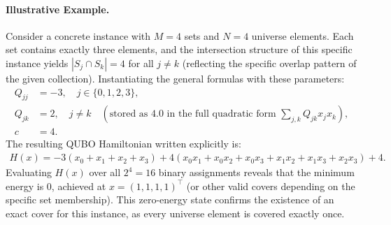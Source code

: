 \documentclass[12pt]{article}
\begin{document}
\paragraph{Illustrative Example.}
Consider a concrete instance with $M = 4$ sets and $N = 4$ universe elements. Each set contains exactly three elements, and the intersection structure of this specific instance yields $|S_j \cap S_k| = 4$ for all $j \neq k$ (reflecting the specific overlap pattern of the given collection). Instantiating the general formulas with these parameters:
\begin{align}
    Q_{jj} &= -3, \quad j \in \{0, 1, 2, 3\}, \\
    Q_{jk} &= 2, \quad j \neq k \quad (\text{stored as } 4.0 \text{ in the full quadratic form } \sum_{j,k} Q_{jk}x_jx_k), \\
    c &= 4.
\end{align}
The resulting QUBO Hamiltonian written explicitly is:
\begin{align}
    H(x) = -3(x_0 + x_1 + x_2 + x_3) + 4(x_0x_1 + x_0x_2 + x_0x_3 + x_1x_2 + x_1x_3 + x_2x_3) + 4.
\end{align}
Evaluating $H(x)$ over all $2^4 = 16$ binary assignments reveals that the minimum energy is $0$, achieved at $x = (1, 1, 1, 1)^\top$ (or other valid covers depending on the specific set membership). This zero-energy state confirms the existence of an exact cover for this instance, as every universe element is covered exactly once.
\end{document}
